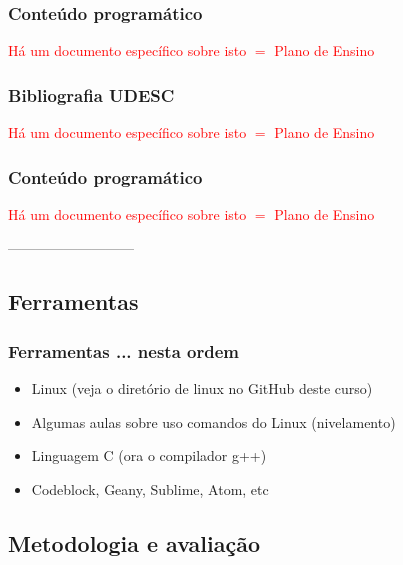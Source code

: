 \begin{frame}
\frametitle{Conteúdo programático}

   \textcolor{red}{Há um documento específico sobre isto $=$ Plano de Ensino}
    
\end{frame}


\begin{frame}
\frametitle{Bibliografia UDESC}

    \textcolor{red}{Há um documento específico sobre isto $=$ Plano de Ensino}
      
 \end{frame}


\begin{frame}
\frametitle{Conteúdo programático}

 \textcolor{red}{Há um documento específico sobre isto $=$ Plano de Ensino}

\end{frame}
---------------------------

\subsection{Ferramentas}
\begin{frame}

    \frametitle{Ferramentas ... nesta ordem}

  \begin{itemize}
   \item Linux (veja o diret\'orio de linux no GitHub deste curso)
   \item Algumas aulas sobre uso comandos do Linux (nivelamento)
    \item Linguagem C (ora o compilador g++)
    \item Codeblock, Geany, Sublime, Atom, etc
            

      
    \end{itemize}
\end{frame}


\subsection{Metodologia e avaliação}  

